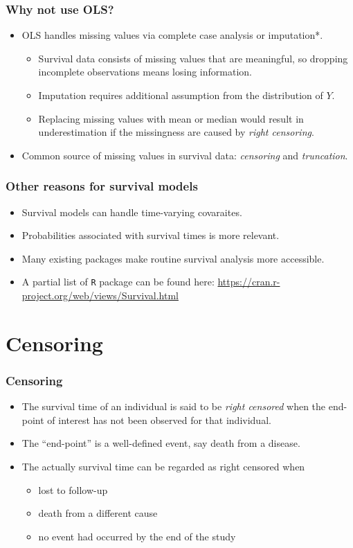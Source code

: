\documentclass[10pt]{beamer}\usepackage[]{graphicx}\usepackage[]{color}
\newcommand{\empr}[1]{{\emph{\color{red}#1}}}
\newcommand{\R}{\texttt{R} }%
\begin{document}
\begin{frame}
  \frametitle{Why not use OLS?}
  \begin{itemize}
  \item OLS handles missing values via complete case analysis or imputation*.
    \begin{itemize}
    \item Survival data consists of missing values that are meaningful, 
      so dropping incomplete observations means losing information. 
    \item Imputation requires additional assumption from the distribution of $Y$.
    \item Replacing missing values with mean or median would result in 
      underestimation if the missingness are caused by \empr{right censoring}.
    \end{itemize}
  \item Common source of missing values in survival data: \empr{censoring} and \empr{truncation}.
  \end{itemize}
\end{frame}

\begin{frame}
  \frametitle{Other reasons for survival models}
  \begin{itemize}
  \item Survival models can handle time-varying covaraites.
  \item Probabilities associated with survival times is more relevant.
  \item Many existing packages make routine survival analysis more accessible.
  \item A partial list of \R package can be found here:
    \url{https://cran.r-project.org/web/views/Survival.html}
  \end{itemize}
\end{frame}

\section{Censoring}

\begin{frame}
  \frametitle{Censoring}
  \begin{itemize}
  \item The survival time of an individual is said to be \empr{right censored} when the end-point 
    of interest has not been observed for that individual. 
  \item The ``end-point'' is a well-defined event, say death from a disease.
  \item The actually survival time can be regarded as right censored when
    \begin{itemize}
    \item lost to follow-up
    \item death from a different cause
      \item no event had occurred by the end of the study 
    \end{itemize}
  \end{itemize}
\end{frame}
  
\end{document}
